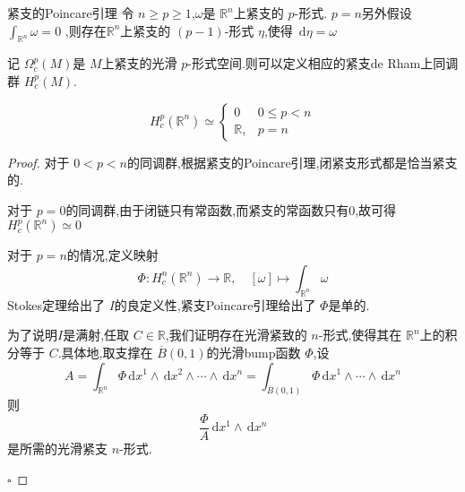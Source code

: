 \documentclass[../../几何与拓扑.tex]{subfiles}
\begin{document}
\begin{lemma}{紧支的Poincare引理}
    令 \(  n\ge p\ge 1  \),\(   \omega   \)是 \(  \mathbb{R} ^{n}  \)上紧支的 \(  p  \)-形式. \(  p= n  \)另外假设 \(  \int_{\mathbb{R} ^{n}} \omega = 0  \)      ,则存在\(  \mathbb{R} ^{n}  \)上紧支的 \(  \left( p-1 \right)   \)-形式 \(  \eta   \),使得 \(  \,\mathrm{d} \eta =  \omega   \)    
\end{lemma}

\begin{definition}
    记 \(   \Omega _{c}^{p}\left( M \right)   \)是 \(  M  \)上紧支的光滑 \(  p  \)-形式空间.则可以定义相应的紧支de Rham上同调群 \(  H_{c}^{p}\left( M \right)   \).    
\end{definition}


\begin{theorem}
    \[
    H_{c}^{p}\left( \mathbb{R} ^{n} \right)\simeq \begin{cases} 0&0\le p< n \\ 
     \mathbb{R} ,&p= n\end{cases}  
    \]
\end{theorem}

\begin{proof}
    对于 \(  0< p< n  \)的同调群,根据紧支的Poincare引理,闭紧支形式都是恰当紧支的.
    
    对于 \(  p= 0  \)的同调群,由于闭链只有常函数,而紧支的常函数只有0,故可得 \(  H_{c}^{p}\left( \mathbb{R} ^{n} \right)\simeq 0   \)  

    对于 \(  p= n  \)的情况,定义映射 \[
    \Phi : H_{c}^{n}\left( \mathbb{R} ^{n} \right) \to \mathbb{R} ,\quad [ \omega ]\mapsto  \int_{\mathbb{R} ^{n}} \omega  
    \] Stokes定理给出了 \(I \)的良定义性,紧支Poincare引理给出了 \(  \Phi   \)是单的.
    
    为了说明\( I \)是满射,任取 \(  C \in \mathbb{R}   \),我们证明存在光滑紧致的 \(  n  \)-形式,使得其在 \(  \mathbb{R} ^{n}  \)上的积分等于 \(  C  \).具体地,取支撑在 \(  \overline{B}\left( 0,1 \right)   \)的光滑bump函数 \(  \Phi   \),设 \[
    A =  \int_{\mathbb{R} ^{n}}\Phi \,\mathrm{d} x^{1}\wedge \,\mathrm{d} x^{2}\wedge \cdots \wedge \,\mathrm{d} x^{n}= \int_{\overline{B}\left( 0,1 \right) }\Phi \,\mathrm{d} x^{1}\wedge \cdots \wedge \,\mathrm{d} x^{n}
    \]    则 \[
    \frac{\Phi  }{A }\,\mathrm{d} x^{1}\wedge \,\mathrm{d} x^{n} 
    \]是所需的光滑紧支 \(  n  \)-形式.    

    \hfill $\square$
\end{proof}

\vspace{1em} %
\end{document}
